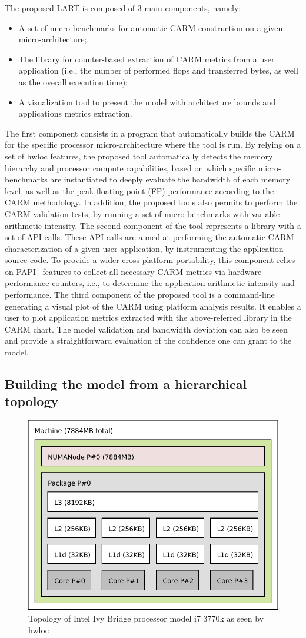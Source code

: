 \documentclass[twoside,twocolumn,8pt]{extarticle}
\begin{document}
The proposed LART is composed of 3 main components, namely:
\begin{itemize}
\item A set of micro-benchmarks for automatic CARM construction on a given micro-architecture;
\item The library for counter-based extraction  of CARM metrics from a user application (i.e., the number of performed flops and
  transferred bytes, as well as the overall execution time);
\item A visualization tool to present the model with architecture bounds and applications metrics extraction.
\end{itemize}

The first component consists in a program that automatically  builds the CARM for the specific processor micro-architecture where
the tool is run. By relying on a set of hwloc features, the proposed tool automatically detects the memory hierarchy and processor
compute capabilities, based on which specific micro-benchmarks are instantiated to deeply evaluate the bandwidth of each memory
level,  as well as the peak floating point (FP) performance according to the CARM methodology.
In addition, the proposed tools also permits to perform the CARM validation tests, by running a set of micro-benchmarks with
variable arithmetic intensity. 
The second component of the tool represents  a library with a set of API calls. These API calls are aimed at performing the
automatic CARM characterization of a given user application, by instrumenting the application source code.
To provide a wider cross-platform portability, this component relies on PAPI~\cite{mucci1999papi} features to collect all
necessary CARM metrics via hardware performance counters, i.e., to determine the application arithmetic intensity and performance.
The third component of the proposed tool is a command-line generating a visual plot of the CARM using platform analysis results. It
enables a user to plot application metrics extracted with the above-referred library in the CARM chart.
The model validation and bandwidth deviation can also be seen and provide a straightforward evaluation of the confidence one can
grant to the model.

\subsection{Building the model from a hierarchical topology}
\label{sub:model_build}

\begin{figure}
  \includegraphics[width=.48\textwidth]{pictures/i7_3770k.pdf}
  \caption{Topology of Intel Ivy Bridge processor model i7 3770k as seen by hwloc}
  \label{fig:topology_adriana}
\end{figure}
\end{document}
